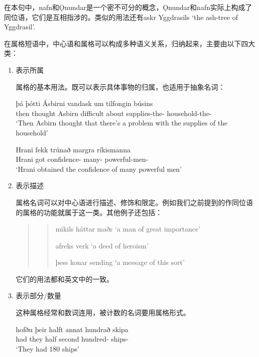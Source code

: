 在本句中，nafn和\k{O}nundar是一个密不可分的概念，\k{O}nundar和nafn实际上构成了同位语，它们是互相指涉的。类似的用法还有askr Yggdrasils `the ash-tree of Yggdrasil'.

在属格短语中，中心语和属格可以构成多种语义关系，归纳起来，主要由以下四大类：
\begin{enumerate}[itemindent=1em]
    \setlength{\parindent}{2em}
    \item 表示所属

          属格的基本用法。既可以表示具体事物的归属，也适用于抽象名词：
          \begin{exe}
              \ex \gll
              þá þótti Ásbirni vandask um tilfongin búsins\\
              then thought Asbirn difficult about supplies-the-{\acc} household-the-{\gen}\\
              \trans `Then Asbirn thought that there's a problem with the supplies of the household'

              \ex \gll
              Hrani fekk trúnað margra ríkismanna\\
              Hrani got confidence-{\acc} many-{\gen} powerful-men-{\gen}\\
              \trans `Hrani obtained the confidence of many powerful men'
          \end{exe}

    \item 表示描述

          属格名词可以对中心语进行描述、修饰和限定。例如我们之前提到的作同位语的属格的功能就属于这一类。其他例子还包括：
          \begin{quote}
              \begin{quote}
                  mikils háttar maðr `a man of great importance'

                  afreks verk `a deed of heroism'

                  þess konar sending `a message of this sort'

              \end{quote}
          \end{quote}

          它们的用法都和英文中的一致。
    \item 表示部分/数量

          这种属格经常和数词连用，被计数的名词要用属格形式。
          \begin{exe}
              \ex \gll
              hofðu þeir halft annat hundrað skipa\\
              had they half second hundred-{\acc} ships-{\gen}\\
              \trans `They had 180 ships'


\end{exe}
\end{enumerate}
